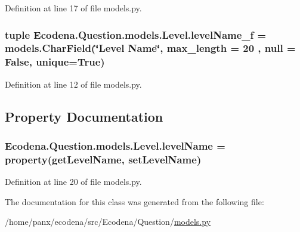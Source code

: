 Definition at line 17 of file models.py.

\hypertarget{class_ecodena_1_1_question_1_1models_1_1_level_a382048e5ad81690f65ed99a76d75d456}{
\subsubsection[{levelName\_\-f}]{\setlength{\rightskip}{0pt plus 5cm}tuple {\bf Ecodena.Question.models.Level.levelName\_\-f} = models.CharField(\char`\"{}Level Name\char`\"{}, max\_\-length = 20 , null = False, unique=True)}}
\label{da/d99/class_ecodena_1_1_question_1_1models_1_1_level_a382048e5ad81690f65ed99a76d75d456}


Definition at line 12 of file models.py.



\subsection{Property Documentation}
\hypertarget{class_ecodena_1_1_question_1_1models_1_1_level_a3a8da4d8c87344f8e1c6f7543253ebc2}{
\subsubsection[{levelName}]{\setlength{\rightskip}{0pt plus 5cm}Ecodena.Question.models.Level.levelName = property(getLevelName, setLevelName)}}
\label{da/d99/class_ecodena_1_1_question_1_1models_1_1_level_a3a8da4d8c87344f8e1c6f7543253ebc2}


Definition at line 20 of file models.py.



The documentation for this class was generated from the following file:\begin{DoxyCompactItemize}
\item 
/home/panx/ecodena/src/Ecodena/Question/\hyperlink{_question_2models_8py}{models.py}\end{DoxyCompactItemize}
